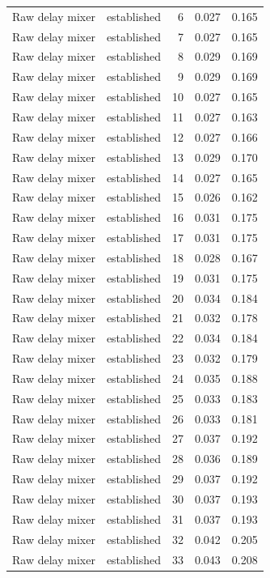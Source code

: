 \begin{tabular}{llrrr}
Raw delay mixer & established & 6 & 0.027 & 0.165 \\
Raw delay mixer & established & 7 & 0.027 & 0.165 \\
Raw delay mixer & established & 8 & 0.029 & 0.169 \\
Raw delay mixer & established & 9 & 0.029 & 0.169 \\
Raw delay mixer & established & 10 & 0.027 & 0.165 \\
Raw delay mixer & established & 11 & 0.027 & 0.163 \\
Raw delay mixer & established & 12 & 0.027 & 0.166 \\
Raw delay mixer & established & 13 & 0.029 & 0.170 \\
Raw delay mixer & established & 14 & 0.027 & 0.165 \\
Raw delay mixer & established & 15 & 0.026 & 0.162 \\
Raw delay mixer & established & 16 & 0.031 & 0.175 \\
Raw delay mixer & established & 17 & 0.031 & 0.175 \\
Raw delay mixer & established & 18 & 0.028 & 0.167 \\
Raw delay mixer & established & 19 & 0.031 & 0.175 \\
Raw delay mixer & established & 20 & 0.034 & 0.184 \\
Raw delay mixer & established & 21 & 0.032 & 0.178 \\
Raw delay mixer & established & 22 & 0.034 & 0.184 \\
Raw delay mixer & established & 23 & 0.032 & 0.179 \\
Raw delay mixer & established & 24 & 0.035 & 0.188 \\
Raw delay mixer & established & 25 & 0.033 & 0.183 \\
Raw delay mixer & established & 26 & 0.033 & 0.181 \\
Raw delay mixer & established & 27 & 0.037 & 0.192 \\
Raw delay mixer & established & 28 & 0.036 & 0.189 \\
Raw delay mixer & established & 29 & 0.037 & 0.192 \\
Raw delay mixer & established & 30 & 0.037 & 0.193 \\
Raw delay mixer & established & 31 & 0.037 & 0.193 \\
Raw delay mixer & established & 32 & 0.042 & 0.205 \\
Raw delay mixer & established & 33 & 0.043 & 0.208 \\

\end{tabular}

